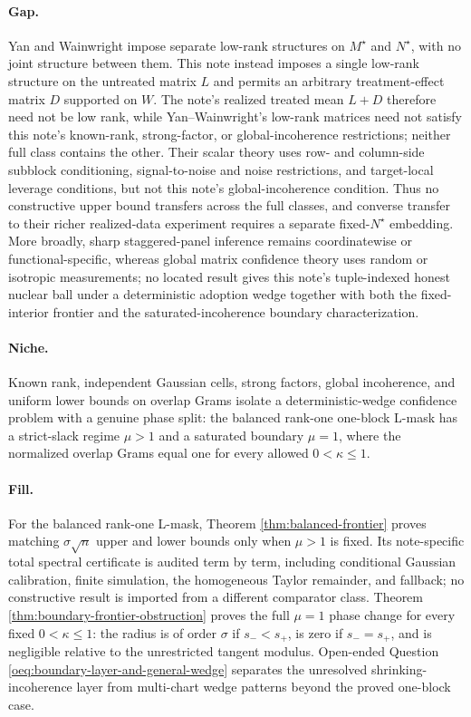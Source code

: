 \documentclass{article}
\begin{document}
\paragraph{Gap.} Yan and Wainwright impose separate low-rank structures on \(M^\star\) and \(N^\star\), with no joint structure between them. This note instead imposes a single low-rank structure on the untreated matrix \(L\) and permits an arbitrary treatment-effect matrix \(D\) supported on \(W\). The note's realized treated mean \(L+D\) therefore need not be low rank, while Yan--Wainwright's low-rank matrices need not satisfy this note's known-rank, strong-factor, or global-incoherence restrictions; neither full class contains the other. Their scalar theory uses row- and column-side subblock conditioning, signal-to-noise and noise restrictions, and target-local leverage conditions, but not this note's global-incoherence condition. Thus no constructive upper bound transfers across the full classes, and converse transfer to their richer realized-data experiment requires a separate fixed-\(N^\star\) embedding. More broadly, sharp staggered-panel inference remains coordinatewise or functional-specific, whereas global matrix confidence theory uses random or isotropic measurements; no located result gives this note's tuple-indexed honest nuclear ball under a deterministic adoption wedge together with both the fixed-interior frontier and the saturated-incoherence boundary characterization.

\paragraph{Niche.} Known rank, independent Gaussian cells, strong factors, global incoherence, and uniform lower bounds on overlap Grams isolate a deterministic-wedge confidence problem with a genuine phase split: the balanced rank-one one-block L-mask has a strict-slack regime \(\mu>1\) and a saturated boundary \(\mu=1\), where the normalized overlap Grams equal one for every allowed \(0<\kappa\le1\).

\paragraph{Fill.} For the balanced rank-one L-mask, Theorem \ref{thm:balanced-frontier} proves matching \(\sigma\sqrt n\) upper and lower bounds only when \(\mu>1\) is fixed. Its note-specific total spectral certificate is audited term by term, including conditional Gaussian calibration, finite simulation, the homogeneous Taylor remainder, and fallback; no constructive result is imported from a different comparator class. Theorem \ref{thm:boundary-frontier-obstruction} proves the full \(\mu=1\) phase change for every fixed \(0<\kappa\le1\): the radius is of order \(\sigma\) if \(s_-<s_+\), is zero if \(s_-=s_+\), and is negligible relative to the unrestricted tangent modulus. Open-ended Question \ref{oeq:boundary-layer-and-general-wedge} separates the unresolved shrinking-incoherence layer from multi-chart wedge patterns beyond the proved one-block case.
\end{document}
